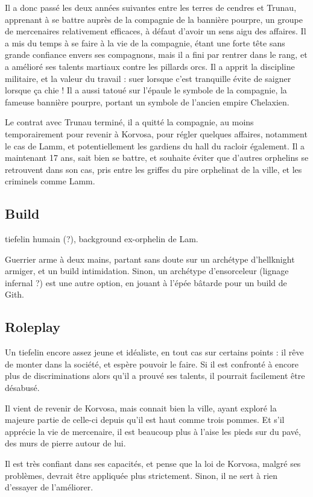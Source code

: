 \documentclass[10pt,a4paper]{book}
\begin{document}
Il a donc passé les deux années suivantes entre les terres de cendres et Trunau, apprenant à se battre auprès de la compagnie de la bannière pourpre, un groupe de mercenaires relativement efficaces, à défaut d'avoir un sens aigu des affaires. Il a mis du temps à se faire à la vie de la compagnie, étant une forte tête sans grande confiance envers ses compagnons, mais il a fini par rentrer dans le rang, et a amélioré ses talents martiaux contre les pillards orcs. Il a apprit la discipline militaire, et la valeur du travail : suer lorsque c'est tranquille évite de saigner lorsque ça chie ! Il a aussi tatoué sur l'épaule le symbole de la compagnie, la fameuse bannière pourpre, portant un symbole de l'ancien empire Chelaxien.

Le contrat avec Trunau terminé, il a quitté la compagnie, au moins temporairement pour revenir à Korvosa, pour régler quelques affaires, notamment le cas de Lamm, et potentiellement les gardiens du hall du racloir également. Il a maintenant 17 ans, sait bien se battre, et souhaite éviter que d'autres orphelins se retrouvent dans son cas, pris entre les griffes du pire orphelinat de la ville, et les criminels comme Lamm.
\subsection{Build}
tiefelin humain (?), background ex-orphelin de Lam.

Guerrier arme à deux mains, partant sans doute sur un archétype d'hellknight armiger, et un build intimidation. Sinon, un archétype d'ensorceleur (lignage infernal ?) est une autre option, en jouant à l'épée bâtarde pour un build de Gith.
\subsection{Roleplay}
Un tiefelin encore assez jeune et idéaliste, en tout cas sur certains points : il rêve de monter dans la société, et espère pouvoir le faire. Si il est confronté à encore plus de discriminations alors qu'il a prouvé ses talents, il pourrait facilement être désabusé.

Il vient de revenir de Korvosa, mais connait bien la ville, ayant exploré la majeure partie de celle-ci depuis qu'il est haut comme trois pommes. Et s'il apprécie la vie de mercenaire, il est beaucoup plus à l'aise les pieds sur du pavé, des murs de pierre autour de lui.

Il est très confiant dans ses capacités, et pense que la loi de Korvosa, malgré ses problèmes, devrait être appliquée plus strictement. Sinon, il ne sert à rien d'essayer de l'améliorer.
\end{document}
